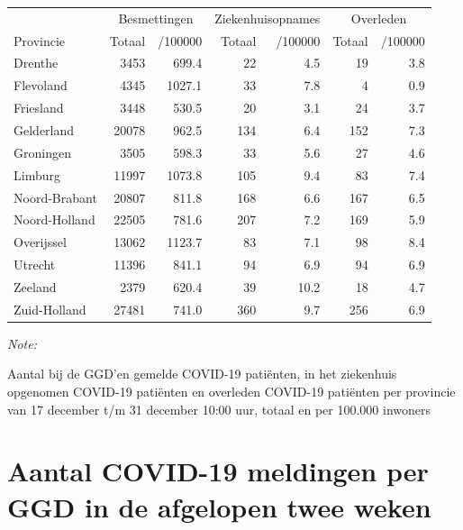 \documentclass[
  english,
  man,floatsintext]{apa6}
\begin{document}
\begin{table}[H]
\centering
\begin{threeparttable}
\begin{tabular}{lrrrrrr}
\toprule
\multicolumn{1}{c}{ } & \multicolumn{2}{c}{Besmettingen} & \multicolumn{2}{c}{Ziekenhuisopnames} & \multicolumn{2}{c}{Overleden} \\
\cmidrule(l{3pt}r{3pt}){2-3} \cmidrule(l{3pt}r{3pt}){4-5} \cmidrule(l{3pt}r{3pt}){6-7}
Provincie & Totaal & /100000 & Totaal & /100000 & Totaal & /100000\\
\midrule
Drenthe & 3453 & 699.4 & 22 & 4.5 & 19 & 3.8\\
Flevoland & 4345 & 1027.1 & 33 & 7.8 & 4 & 0.9\\
Friesland & 3448 & 530.5 & 20 & 3.1 & 24 & 3.7\\
Gelderland & 20078 & 962.5 & 134 & 6.4 & 152 & 7.3\\
Groningen & 3505 & 598.3 & 33 & 5.6 & 27 & 4.6\\
Limburg & 11997 & 1073.8 & 105 & 9.4 & 83 & 7.4\\
Noord-Brabant & 20807 & 811.8 & 168 & 6.6 & 167 & 6.5\\
Noord-Holland & 22505 & 781.6 & 207 & 7.2 & 169 & 5.9\\
Overijssel & 13062 & 1123.7 & 83 & 7.1 & 98 & 8.4\\
Utrecht & 11396 & 841.1 & 94 & 6.9 & 94 & 6.9\\
Zeeland & 2379 & 620.4 & 39 & 10.2 & 18 & 4.7\\
Zuid-Holland & 27481 & 741.0 & 360 & 9.7 & 256 & 6.9\\
\bottomrule
\end{tabular}
\begin{tablenotes}
\item \textit{Note: } 
\item Aantal bij de GGD’en gemelde COVID-19 patiënten, in het ziekenhuis opgenomen COVID-19 patiënten en overleden COVID-19 patiënten per provincie van 17 december t/m 31 december 10:00 uur, totaal en per 100.000 inwoners
\end{tablenotes}
\end{threeparttable}
\end{table}

\newpage

\hypertarget{aantal-covid-19-meldingen-per-ggd-in-de-afgelopen-twee-weken}{%
\section{Aantal COVID-19 meldingen per GGD in de afgelopen twee weken}\label{aantal-covid-19-meldingen-per-ggd-in-de-afgelopen-twee-weken}}
\end{document}

